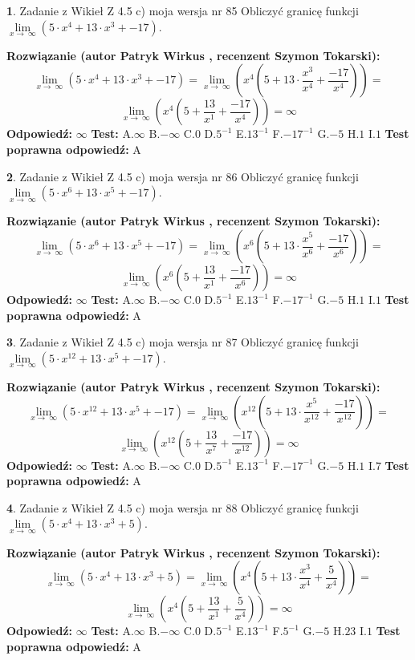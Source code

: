 \documentclass[12pt, a4paper]{article}
\theoremstyle{definition} %
\newtheorem{zad}{}
\newcommand{\zadStart}[1]{\begin{zad}#1\newline}
\newcommand{\zadStop}{\end{zad}}
\newcommand{\rozwStart}[2]{\noindent \textbf{Rozwiązanie (autor #1 , recenzent #2): }\newline}
\newcommand{\rozwStop}{\newline}
\newcommand{\odpStart}{\noindent \textbf{Odpowiedź:}\newline}
\newcommand{\odpStop}{\newline}
\newcommand{\testStart}{\noindent \textbf{Test:}\newline}
\newcommand{\testStop}{\newline}
\newcommand{\kluczStart}{\noindent \textbf{Test poprawna odpowiedź:}\newline}
\newcommand{\kluczStop}{\newline}
\begin{document}
\zadStart{Zadanie z Wikieł Z 4.5 c) moja wersja nr 85}
Obliczyć granicę funkcji  $\lim\limits_{x\to\ \infty}(5 \cdot x^{4}+13 \cdot x^{3}+-17)$.
\zadStop
\rozwStart{Patryk Wirkus}{Szymon Tokarski}
$$\lim\limits_{x\to\ \infty}(5 \cdot x^{4}+13 \cdot x^{3}+-17) = \lim\limits_{x\to\ \infty}(x^{4}(5 +13 \cdot \frac{x^{3}}{x^{4}}+\frac{-17}{x^{4}})) =$$ $$\lim\limits_{x\to\ \infty}(x^{4}(5 +\frac{13}{x^{1}}+\frac{-17}{x^{4}})) =\infty$$
\rozwStop
\odpStart
$\infty$
\odpStop
\testStart
A.$\infty$ B.$-\infty$ C.$0$ D.$5^{-1}$ E.$13^{-1}$
F.$-17^{-1}$ G.$-5$
H.$1$
I.$1$
\testStop
\kluczStart
A
\kluczStop



\zadStart{Zadanie z Wikieł Z 4.5 c) moja wersja nr 86}
Obliczyć granicę funkcji  $\lim\limits_{x\to\ \infty}(5 \cdot x^{6}+13 \cdot x^{5}+-17)$.
\zadStop
\rozwStart{Patryk Wirkus}{Szymon Tokarski}
$$\lim\limits_{x\to\ \infty}(5 \cdot x^{6}+13 \cdot x^{5}+-17) = \lim\limits_{x\to\ \infty}(x^{6}(5 +13 \cdot \frac{x^{5}}{x^{6}}+\frac{-17}{x^{6}})) =$$ $$\lim\limits_{x\to\ \infty}(x^{6}(5 +\frac{13}{x^{1}}+\frac{-17}{x^{6}})) =\infty$$
\rozwStop
\odpStart
$\infty$
\odpStop
\testStart
A.$\infty$ B.$-\infty$ C.$0$ D.$5^{-1}$ E.$13^{-1}$
F.$-17^{-1}$ G.$-5$
H.$1$
I.$1$
\testStop
\kluczStart
A
\kluczStop



\zadStart{Zadanie z Wikieł Z 4.5 c) moja wersja nr 87}
Obliczyć granicę funkcji  $\lim\limits_{x\to\ \infty}(5 \cdot x^{12}+13 \cdot x^{5}+-17)$.
\zadStop
\rozwStart{Patryk Wirkus}{Szymon Tokarski}
$$\lim\limits_{x\to\ \infty}(5 \cdot x^{12}+13 \cdot x^{5}+-17) = \lim\limits_{x\to\ \infty}(x^{12}(5 +13 \cdot \frac{x^{5}}{x^{12}}+\frac{-17}{x^{12}})) =$$ $$\lim\limits_{x\to\ \infty}(x^{12}(5 +\frac{13}{x^{7}}+\frac{-17}{x^{12}})) =\infty$$
\rozwStop
\odpStart
$\infty$
\odpStop
\testStart
A.$\infty$ B.$-\infty$ C.$0$ D.$5^{-1}$ E.$13^{-1}$
F.$-17^{-1}$ G.$-5$
H.$1$
I.$7$
\testStop
\kluczStart
A
\kluczStop



\zadStart{Zadanie z Wikieł Z 4.5 c) moja wersja nr 88}
Obliczyć granicę funkcji  $\lim\limits_{x\to\ \infty}(5 \cdot x^{4}+13 \cdot x^{3}+5)$.
\zadStop
\rozwStart{Patryk Wirkus}{Szymon Tokarski}
$$\lim\limits_{x\to\ \infty}(5 \cdot x^{4}+13 \cdot x^{3}+5) = \lim\limits_{x\to\ \infty}(x^{4}(5 +13 \cdot \frac{x^{3}}{x^{4}}+\frac{5}{x^{4}})) =$$ $$\lim\limits_{x\to\ \infty}(x^{4}(5 +\frac{13}{x^{1}}+\frac{5}{x^{4}})) =\infty$$
\rozwStop
\odpStart
$\infty$
\odpStop
\testStart
A.$\infty$ B.$-\infty$ C.$0$ D.$5^{-1}$ E.$13^{-1}$
F.$5^{-1}$ G.$-5$
H.$23$
I.$1$
\testStop
\kluczStart
A
\kluczStop
\end{document}
